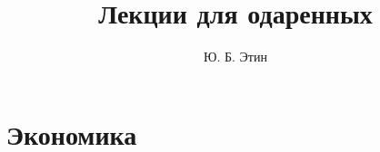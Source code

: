 \documentclass[a4paper,12pt]{book}
\begin{document}
\author{Ю. Б. Этин}
\title{Лекции для одаренных}

\frontmatter
\maketitle
\tableofcontents

\mainmatter
\chapter{Экономика}




\backmatter
\end{document}
